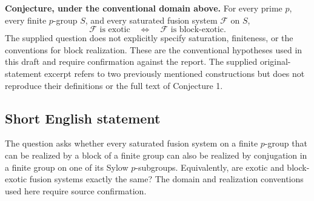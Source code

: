 \documentclass[11pt]{article}
\begin{document}
\textbf{Conjecture, under the conventional domain above.} For every prime \(p\), every finite \(p\)-group \(S\), and every saturated fusion system \(\mathcal F\) on \(S\),
\[
\mathcal F\text{ is exotic}
\quad\Longleftrightarrow\quad
\mathcal F\text{ is block-exotic}.
\]
The supplied question does not explicitly specify saturation, finiteness, or the conventions for block realization. These are the conventional hypotheses used in this draft and require confirmation against the report. The supplied original-statement excerpt refers to two previously mentioned constructions but does not reproduce their definitions or the full text of Conjecture 1.
\subsection{Short English statement}
The question asks whether every saturated fusion system on a finite \(p\)-group that can be realized by a block of a finite group can also be realized by conjugation in a finite group on one of its Sylow \(p\)-subgroups. Equivalently, are exotic and block-exotic fusion systems exactly the same? The domain and realization conventions used here require source confirmation.
\end{document}
